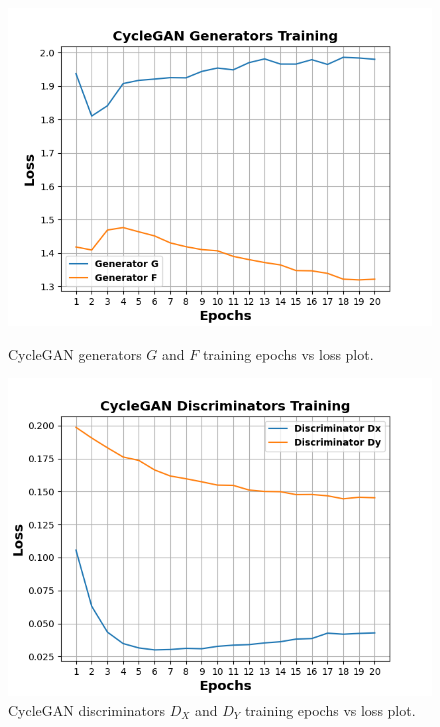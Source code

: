 \begin{figure}[H]
  \centering
  \begin{minipage}[b]{0.49\textwidth}
    \includegraphics[width=\textwidth]{images/Evaluation/CycleGANGeneratorsTraining.png}
    \caption[\ac{CycleGAN} generators $G$ and $F$ training epochs vs loss plot.]{\ac{CycleGAN} generators $G$ and $F$ training epochs vs loss plot.}
    \label{fig:CycleGANGeneratorsTraining}
  \end{minipage}
  \hfill
  \begin{minipage}[b]{0.49\textwidth}
    \includegraphics[width=\textwidth]{images/Evaluation/CycleGANDiscriminatorsTraining.png}
    \caption[\ac{CycleGAN} discriminators $D_X$ and $D_Y$ training epochs vs loss plot.]{\ac{CycleGAN} discriminators $D_X$ and $D_Y$ training epochs vs loss plot.}
    \label{fig:CycleGANDiscriminatorsTraining}
  \end{minipage}
\end{figure}



